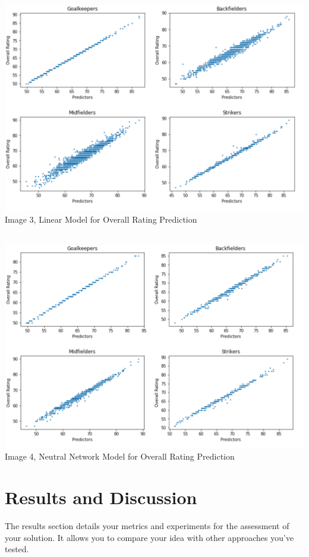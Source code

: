 \documentclass{article}
\begin{document}
\begin{center}
\includegraphics[scale=0.5]{liner.png}\\
\caption{Image 3, Linear Model for Overall Rating Prediction}\\
\includegraphics[scale=0.5]{nn.png} \\
\caption{Image 4, Neutral Network Model for Overall Rating Prediction}
\end{center}


\section*{Results and Discussion}
The results section details your metrics and experiments for the assessment of your solution. It allows you to compare your idea with other approaches you've tested. 

\nocite{*}


\end{document}
